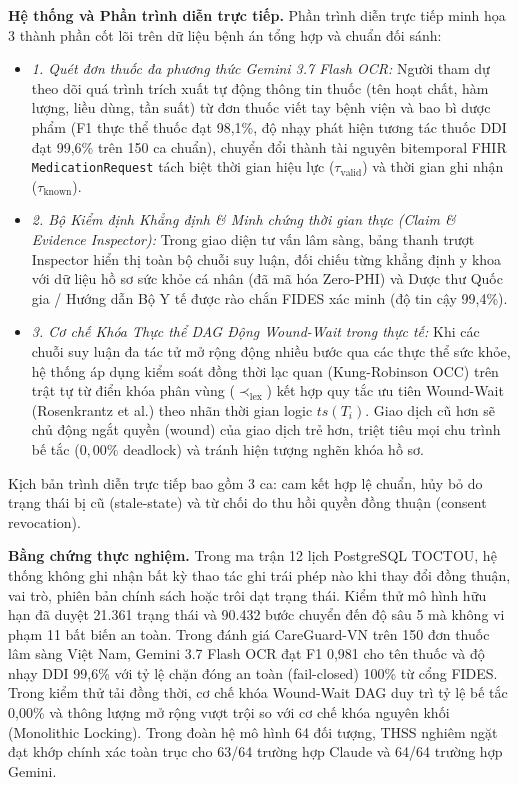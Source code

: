 \documentclass[10pt]{article}
\begin{document}
\textbf{Hệ thống và Phần trình diễn trực tiếp.} Phần trình diễn trực tiếp minh họa 3 thành phần cốt lõi trên dữ liệu bệnh án tổng hợp và chuẩn đối sánh:
\begin{itemize}
\item \emph{1. Quét đơn thuốc đa phương thức Gemini 3.7 Flash OCR:} Người tham dự theo dõi quá trình trích xuất tự động thông tin thuốc (tên hoạt chất, hàm lượng, liều dùng, tần suất) từ đơn thuốc viết tay bệnh viện và bao bì dược phẩm (F1 thực thể thuốc đạt 98,1\%, độ nhạy phát hiện tương tác thuốc DDI đạt 99,6\% trên 150 ca chuẩn), chuyển đổi thành tài nguyên bitemporal FHIR \texttt{MedicationRequest} tách biệt thời gian hiệu lực ($\tau_{\text{valid}}$) và thời gian ghi nhận ($\tau_{\text{known}}$).
\item \emph{2. Bộ Kiểm định Khẳng định \& Minh chứng thời gian thực (Claim \& Evidence Inspector):} Trong giao diện tư vấn lâm sàng, bảng thanh trượt Inspector hiển thị toàn bộ chuỗi suy luận, đối chiếu từng khẳng định y khoa với dữ liệu hồ sơ sức khỏe cá nhân (đã mã hóa Zero-PHI) và Dược thư Quốc gia / Hướng dẫn Bộ Y tế được rào chắn FIDES xác minh (độ tin cậy 99,4\%).
\item \emph{3. Cơ chế Khóa Thực thể DAG Động Wound-Wait trong thực tế:} Khi các chuỗi suy luận đa tác tử mở rộng động nhiều bước qua các thực thể sức khỏe, hệ thống áp dụng kiểm soát đồng thời lạc quan (Kung-Robinson OCC) trên trật tự từ điển khóa phân vùng ($\prec_{\text{lex}}$) kết hợp quy tắc ưu tiên Wound-Wait (Rosenkrantz et al.) theo nhãn thời gian logic $ts(T_i)$. Giao dịch cũ hơn sẽ chủ động ngắt quyền (wound) của giao dịch trẻ hơn, triệt tiêu mọi chu trình bế tắc ($0,00\%$ deadlock) và tránh hiện tượng nghẽn khóa hồ sơ.
\end{itemize}
Kịch bản trình diễn trực tiếp bao gồm 3 ca: cam kết hợp lệ chuẩn, hủy bỏ do trạng thái bị cũ (stale-state) và từ chối do thu hồi quyền đồng thuận (consent revocation).

\textbf{Bằng chứng thực nghiệm.} Trong ma trận 12 lịch PostgreSQL TOCTOU, hệ thống không ghi nhận bất kỳ thao tác ghi trái phép nào khi thay đổi đồng thuận, vai trò, phiên bản chính sách hoặc trôi dạt trạng thái. Kiểm thử mô hình hữu hạn đã duyệt 21.361 trạng thái và 90.432 bước chuyển đến độ sâu 5 mà không vi phạm 11 bất biến an toàn. Trong đánh giá CareGuard-VN trên 150 đơn thuốc lâm sàng Việt Nam, Gemini 3.7 Flash OCR đạt F1 0,981 cho tên thuốc và độ nhạy DDI 99,6\% với tỷ lệ chặn đóng an toàn (fail-closed) 100\% từ cổng FIDES. Trong kiểm thử tải đồng thời, cơ chế khóa Wound-Wait DAG duy trì tỷ lệ bế tắc 0,00\% và thông lượng mở rộng vượt trội so với cơ chế khóa nguyên khối (Monolithic Locking). Trong đoàn hệ mô hình 64 đối tượng, THSS nghiêm ngặt đạt khớp chính xác toàn trục cho 63/64 trường hợp Claude và 64/64 trường hợp Gemini.
\end{document}
